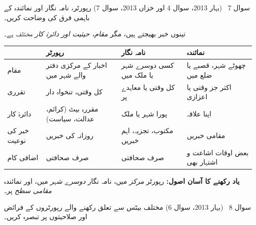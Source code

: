 \begin{sawal}{سوال \textenglish{7} \ \textnormal{\small(بہار \textenglish{2013}، سوال \textenglish{4} اور خزاں \textenglish{2013}، سوال \textenglish{7})}}
رپورٹر، نامہ نگار اور نمائندہ کے باہمی فرق کی وضاحت کریں۔
\end{sawal}

\begin{hal}
تینوں خبر بھیجتے ہیں، مگر \emph{مقام، حیثیت اور دائرۂ کار} مختلف ہے۔

\medskip
\begin{center}
\begin{tabular}{@{}p{2.4cm} p{4.0cm} p{3.8cm} p{3.6cm}@{}}
\toprule
 & \textbf{رپورٹر} & \textbf{نامہ نگار} & \textbf{نمائندہ} \\
\midrule
مقام & اخبار کے مرکزی دفتر والے شہر میں & کسی دوسرے شہر یا ملک میں & چھوٹے شہر، قصبے یا ضلع میں \\
تقرری & کل وقتی، تنخواہ دار & کل وقتی یا معاہدے پر & اکثر جز وقتی یا اعزازی \\
دائرۂ کار & مقررہ بیٹ (کرائم، عدالت، سیاست) & پورا شہر یا ملک & اپنا علاقہ \\
خبر کی نوعیت & روزانہ کی خبریں & مکتوب، تجزیہ، اہم خبریں & مقامی خبریں \\
اضافی کام & صرف صحافتی & صرف صحافتی & بعض اوقات اشاعت و اشتہار بھی \\
\bottomrule
\end{tabular}
\end{center}

\medskip
\textbf{یاد رکھنے کا آسان اصول:} رپورٹر \emph{مرکز} میں، نامہ نگار
\emph{دوسرے شہر} میں، اور نمائندہ \emph{مقامی سطح} پر۔

\end{hal}

\begin{sawal}{سوال \textenglish{8} \ \textnormal{\small(بہار \textenglish{2013}، سوال \textenglish{6})}}
مختلف بیٹس سے تعلق رکھنے والے رپورٹروں کے فرائض اور صلاحیتوں پر تبصرہ کریں۔
\end{sawal}

